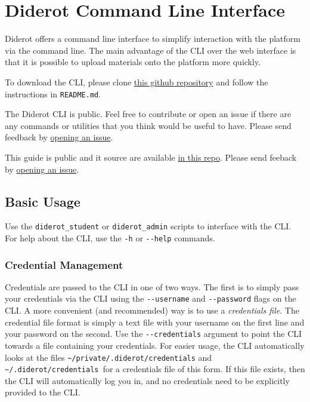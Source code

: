 \chapter{Diderot Command Line Interface}
\label{ch:cli}

Diderot offers a command line interface to simplify interaction with
the platform via the command line.
%
The main advantage of the CLI over the web interface is that it is possible to upload materials onto the platform more quickly.

\begin{important}


To download the CLI, please clone 
%
\href{https://github.com/diderot-edu/diderot-cli}{this github repository}
%
and follow the instructions in \lstinline`README.md`. 

The Diderot CLI is public. Feel free to contribute or open an issue if there
are any commands or utilities that you think would be useful to have.
%
Please send feedback by 
\href{https://github.com/diderot-edu/diderot-cli/issues}{opening an issue}.

This guide is public and it source are available 
\href{https://github.com/diderot-edu/diderot-guide}{in this repo}.
%
Please send feeback by \href{https://github.com/diderot-edu/diderot-guide/issues}{opening an issue}.
\end{important}


\section{Basic Usage}

Use the \verb|diderot_student| or \verb|diderot_admin| scripts to interface with the CLI.
%
For help about the CLI, use the \verb|-h| or \verb|--help| commands.

\subsection{Credential Management}
Credentials are passed to the CLI in one of two ways. 
%
The first is to simply pass your credentials via the CLI using the \verb|--username| and \verb|--password| flags on the CLI. 
%
A more convenient (and recommended) way is to use a \emph{credentials file}.
%
The credential file format is simply a text file with your username on the first line and your password on the second. 
%
Use the \verb|--credentials| argument to point the CLI towards a file containing your credentials.
%
For easier usage, the CLI automatically looks at the files \verb|~/private/.diderot/credentials| and \verb|~/.diderot/credentials |for a credentials file of this form. 
%
If this file exists, then the CLI will automatically log you in, and no credentials need to be explicitly provided to the CLI.
%

